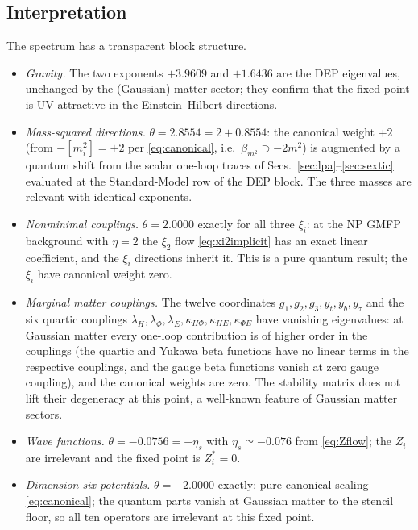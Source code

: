 \documentclass[11pt]{article}
\begin{document}
\subsection{Interpretation}
\label{sec:interpretation}

The spectrum has a transparent block structure.
\begin{itemize}
  \item \emph{Gravity.} The two exponents $+3.9609$ and $+1.6436$ are the
        DEP eigenvalues, unchanged by the (Gaussian) matter sector; they
        confirm that the fixed point is UV attractive in the
        Einstein--Hilbert directions.
  \item \emph{Mass-squared directions.} $\theta=2.8554=2+0.8554$: the
        canonical weight $+2$ (from $-[m_i^2]=+2$ per
        \eqref{eq:canonical}, i.e.\ $\beta_{m^2}\supset -2m^2$) is augmented
        by a quantum shift from the scalar one-loop traces of
        Secs.~\ref{sec:lpa}--\ref{sec:sextic} evaluated at the Standard-Model
        row of the DEP block.  The three masses are relevant with identical
        exponents.
  \item \emph{Nonminimal couplings.} $\theta=2.0000$ exactly for all three
        $\xi_i$: at the NP GMFP background with $\eta=2$ the $\xi_2$ flow
        \eqref{eq:xi2implicit} has an exact linear coefficient, and the
        $\xi_i$ directions inherit it.  This is a pure quantum result; the
        $\xi_i$ have canonical weight zero.
  \item \emph{Marginal matter couplings.} The twelve coordinates
        $g_1,g_2,g_3,y_t,y_b,y_\tau$ and the six quartic couplings
        $\lambda_H,\lambda_\Phi,\lambda_E,\kappa_{H\Phi},\kappa_{HE},
        \kappa_{\Phi E}$ have vanishing eigenvalues: at Gaussian matter every
        one-loop contribution is of higher order in the couplings (the
        quartic and Yukawa beta functions have no linear terms in the
        respective couplings, and the gauge beta functions vanish at zero
        gauge coupling), and the canonical weights are zero.  The stability
        matrix does not lift their degeneracy at this point, a well-known
        feature of Gaussian matter sectors.
  \item \emph{Wave functions.} $\theta=-0.0756=-\eta_s$ with
        $\eta_s\simeq-0.076$ from \eqref{eq:Zflow}; the $Z_i$ are irrelevant
        and the fixed point is $Z_i^*=0$.
  \item \emph{Dimension-six potentials.} $\theta=-2.0000$ exactly: pure
        canonical scaling \eqref{eq:canonical}; the quantum parts vanish at
        Gaussian matter to the stencil floor, so all ten operators are
        irrelevant at this fixed point.
\end{itemize}
\end{document}
